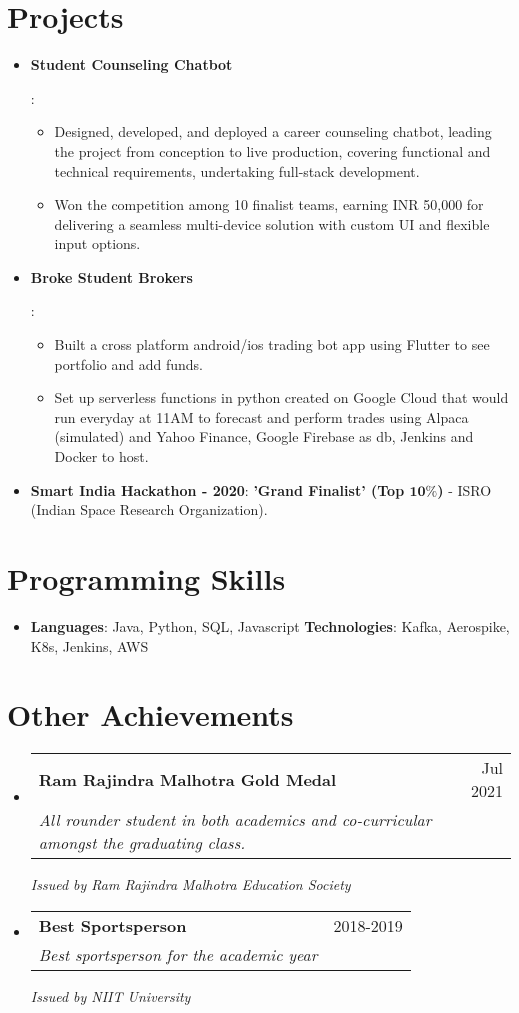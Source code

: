 \documentclass[letterpaper,11pt]{article}
\makeatletter
\newcommand{\resumeItem}[2]{
  \item\small{
    \textbf{#1}{: #2 \vspace{-2pt}}
  }
}
\newcommand{\resumeSubheading}[4]{
  \vspace{-1pt}\item
    \begin{tabular*}{0.97\textwidth}[t]{l@{\extracolsep{\fill}}r}
      \textbf{#1} & #2 \\
      \textit{\small#3} & \textit{\small #4} \\
    \end{tabular*}
    \vspace{-5pt}
}
\newcommand{\resumeSubHeadingListStart}{\begin{itemize}[leftmargin=*]}
\newcommand{\resumeSubHeadingListEnd}{\end{itemize}}
\makeatother
\begin{document}
\section{Projects}
  \resumeSubHeadingListStart
    \resumeItem{Student Counseling Chatbot}
      {
        \begin{itemize} %
          \item Designed, developed, and deployed a career counseling chatbot, leading the project from conception to live production, covering functional and technical requirements, undertaking full-stack development.
          \item Won the competition among 10 finalist teams, earning INR 50,000 for delivering a seamless multi-device solution with custom UI and flexible input options.
        \end{itemize}
      }
    \resumeItem{Broke Student Brokers}
      {
        \begin{itemize} %
          \item Built a cross platform android/ios trading bot app using Flutter to see portfolio and add funds.
          \item Set up serverless functions in python created on Google Cloud that would run everyday at 11AM to forecast and perform trades using Alpaca (simulated) and Yahoo Finance, Google Firebase as db, Jenkins and Docker to host.
        \end{itemize}
      }

    \resumeItem{Smart India Hackathon - 2020}
      {\textbf{'Grand Finalist' (Top $\mathbf{10\%}$)} - ISRO (Indian Space Research Organization).}

  \resumeSubHeadingListEnd

%
\section{Programming Skills}
 \resumeSubHeadingListStart
   \item{
    \textbf{Languages}{: Java, Python, SQL, Javascript}
    \hfill
    \textbf{Technologies}{: Kafka, Aerospike, K8s, Jenkins, AWS}
   }
 \resumeSubHeadingListEnd

%
\section{Other Achievements}
  \resumeSubHeadingListStart
    \resumeSubheading
      {Ram Rajindra Malhotra Gold Medal}{Jul 2021}
      {\textnormal{All rounder student in both academics and co-curricular amongst the graduating class.}}{}{\textit{Issued by Ram Rajindra Malhotra Education Society}}
    \resumeSubheading
      {Best Sportsperson}{2018-2019}
      {\textnormal{Best sportsperson for the academic year}}{}
      {\textit{Issued by NIIT University}}
  \resumeSubHeadingListEnd


\end{document}

